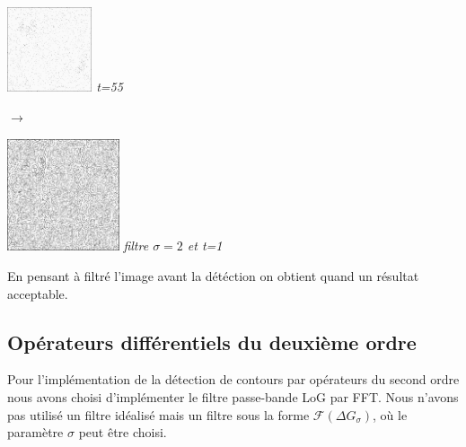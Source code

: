 \documentclass[a4,12pt]{article}
\begin{document}
\begin{minipage}[c]{0.10\linewidth}
	\begin{center}
		\includegraphics[width = 25mm]{./img/p2test_grad_fin_globules10_t55.jpg}
		\textit{t=55}
	\end{center}
\end{minipage}
\hspace{2cm}
$\longrightarrow$
\hspace{1cm}
\begin{minipage}[c]{0.10\linewidth}
	\begin{center}
		\includegraphics[width = 33mm]{./img/globulesbb10_filtre2_fin1.jpg}
		\textit{filtre $\sigma=2$ et t=1}
	\end{center}
\end{minipage}

En pensant à filtré l'image avant la détéction on obtient quand un résultat acceptable.

\subsection{Opérateurs différentiels du deuxième ordre}
Pour l'implémentation de la détection de contours par opérateurs du second ordre nous avons choisi d'implémenter le filtre passe-bande LoG par FFT. Nous n'avons pas utilisé un filtre idéalisé mais un filtre sous la forme $\mathcal{F}(\Delta G_{\sigma})$, où le paramètre $\sigma$ peut être choisi.\\
\end{document}
